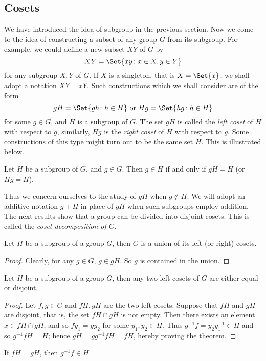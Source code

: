 \documentclass[main.tex]{subfiles}
\begin{document}
			\subsection{Cosets}
				We have introduced the idea of subgroup in the previous section. Now we come to the idea of constructing a subset of any group $G$ from its subgroup. For example, we could define a new subset $XY$ of $G$ by
				\begin{equation*}
					XY = \Set{xy \colon x \in X, y\in Y}
				\end{equation*}
				for any subgroup $X, Y$ of $G$. If $X$ is a singleton, that is $X = \Set{x}$, we shall adopt a notation $XY = xY$. Such constructions which we shall consider are of the form
				\begin{equation*}
					gH = \Set{gh \colon h\in H} \text{ or } Hg = \Set{hg \colon h \in H}
				\end{equation*}
				for some $g \in G$, and $H$ is a subgroup of $G$. The set $gH$ is called the \textit{left coset} of $H$ with respect to $g$, similarly, $Hg$ is the \textit{right coset} of $H$ with respect to $g$. Some constructions of this type might turn out to be the same set $H$. This is illustrated below.
				
				\begin{theorem}
					Let $H$ be a subgroup of $G$, and $g \in G$. Then $g \in H$ if and only if $gH = H$ (or $Hg = H$).
				\end{theorem}
				
				Thus we concern ourselves to the study of $gH$ when $g \notin H$. We will adopt an additive notation $g + H$ in place of $gH$ when such subgroups employ addition. The next results show that a group can be divided into disjoint cosets. This is called the \textit{coset decomposition of $G$}.
				
				\begin{theorem}
					Let $H$ be a subgroup of a group $G$, then $G$ is a union of its left (or right) cosets.
				\end{theorem}
				\begin{proof}
					Clearly, for any $g \in G$, $g \in gH$. So $g$ is contained in the union.
				\end{proof}
			
				\begin{theorem}
					Let $H$ be a subgroup of a group $G$, then any two left cosets of $G$ are either equal or disjoint.
				\end{theorem}
				\begin{proof}
					Let $f, g \in G$ and $fH, gH$ are the two left cosets. Suppose that $fH$ and $gH$ are disjoint, that is, the set $fH \cap gH$ is not empty. Then there exists an element $x \in fH \cap gH$, and so $fy_1 = gy_2$ for some $y_1, y_2 \in H$. Thus $g^{-1}f = y_2y^{-1}_1 \in H$ and so $g^{-1}fH = H$; hence $gH = g g^{-1} f H = fH$, hereby proving the theorem.
				\end{proof}
				\begin{corollary}
					If $fH = gH$, then $g^{-1} f \in H$.
				\end{corollary}
				
\end{document}

